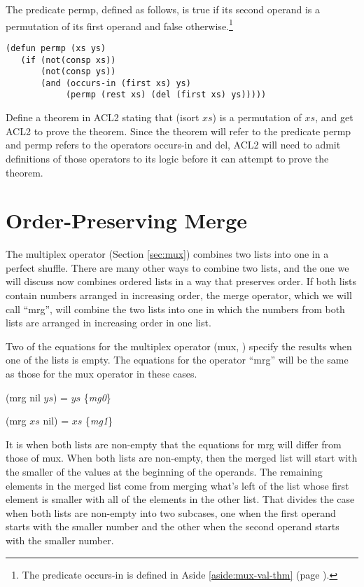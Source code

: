\begin{ExerciseList}
\Exercise
The predicate permp, defined as follows, is true if its second operand
is a permutation of its first operand and false otherwise.\footnote{The
predicate occurs-in is defined in
Aside \ref{aside:mux-val-thm} (page \pageref{aside:mux-val-thm}).}
\label{defun:permp}
\begin{Verbatim}
(defun permp (xs ys)
   (if (not(consp xs))
       (not(consp ys))
       (and (occurs-in (first xs) ys)
            (permp (rest xs) (del (first xs) ys)))))
\end{Verbatim}
Define a theorem in ACL2 stating that (isort $xs$) is a
permutation of $xs$, and
get ACL2 to prove the theorem.
Since the theorem will refer to the predicate permp
and permp refers to the operators occurs-in and del,
ACL2 will need to admit definitions of those operators
to its logic before it can attempt to prove the theorem.

\end{ExerciseList}

\section{Order-Preserving Merge}
\label{sec:mrg}

The multiplex operator (Section \ref{sec:mux})
combines two lists into one in a perfect shuffle.
There are many other ways to combine two lists,
and the one we will discuss now combines ordered lists
in a way that preserves order.
If both lists contain numbers arranged in increasing order,
the merge operator, which we will call ``mrg'',
will combine the two lists
into one in which the numbers from both lists
are arranged in increasing order in one list.

Two of the equations for the multiplex operator (mux, \pageref{def:mux})
specify the results when one of the lists is empty.
The equations for the operator ``mrg'' will be the same as those for
the mux operator in these cases.

\hspace{1cm} (mrg nil $ys$) = $ys$ \hfill \{\emph{mg0}\}

\hspace{1cm} (mrg $xs$ nil) = $xs$ \hfill \{\emph{mg1}\}

It is when both lists are non-empty that the equations for mrg
will differ from those of mux.
When both lists are non-empty, then the merged list will
start with the smaller of the values at the beginning of the operands.
The remaining elements in the merged list come from
merging what's left of the list whose first element is smaller
with all of the elements in the other list.
That divides the case when both lists are non-empty into two
subcases, one when the first operand starts with the smaller number
and the other when the second operand starts with the smaller number.

